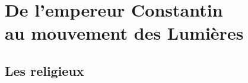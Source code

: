 
\part[De l'empereur Constantin au mouvement des Lumières]{De l'empereur Constantin\\au mouvement des Lumières}













\chapter{Les religieux}













